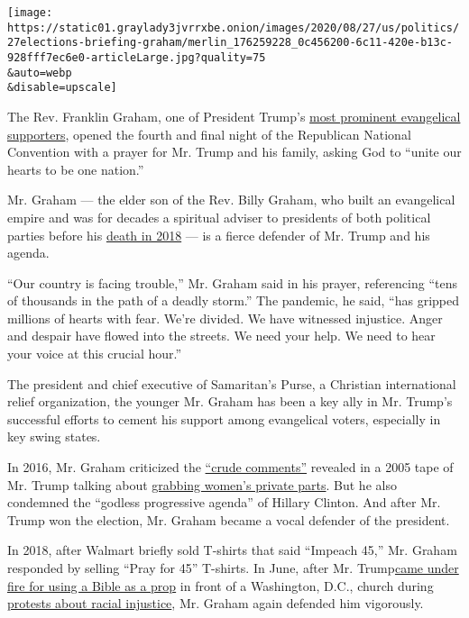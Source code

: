 \texttt{[image: https://static01.graylady3jvrrxbe.onion/images/2020/08/27/us/politics/27elections-briefing-graham/merlin\_176259228\_0c456200-6c11-420e-b13c-928fff7ec6e0-articleLarge.jpg?quality=75\\\&auto=webp\\\&disable=upscale]}

The Rev. Franklin Graham, one of President Trump's
\href{https://www.nytimes3xbfgragh.onion/2018/02/26/us/billy-graham-franklin-graham-trump.html}{most
prominent evangelical supporters}, opened the fourth and final night of
the Republican National Convention with a prayer for Mr. Trump and his
family, asking God to ``unite our hearts to be one nation.''

Mr. Graham --- the elder son of the Rev. Billy Graham, who built an
evangelical empire and was for decades a spiritual adviser to presidents
of both political parties before his
\href{https://www.nytimes3xbfgragh.onion/2018/02/21/obituaries/billy-graham-dead.html}{death
in 2018} --- is a fierce defender of Mr. Trump and his agenda.

``Our country is facing trouble,'' Mr. Graham said in his prayer,
referencing ``tens of thousands in the path of a deadly storm.'' The
pandemic, he said, ``has gripped millions of hearts with fear. We're
divided. We have witnessed injustice. Anger and despair have flowed into
the streets. We need your help. We need to hear your voice at this
crucial hour.''

The president and chief executive of Samaritan's Purse, a Christian
international relief organization, the younger Mr. Graham has been a key
ally in Mr. Trump's successful efforts to cement his support among
evangelical voters, especially in key swing states.

In 2016, Mr. Graham criticized the
\href{https://www.facebookcorewwwi.onion/FranklinGraham/posts/the-crude-comments-made-by-donald-j-trump-more-than-11-years-ago-cannot-be-defen/1271741769548668/}{``crude
comments''} revealed in a 2005 tape of Mr. Trump talking about
\href{https://www.nytimes3xbfgragh.onion/2016/10/08/us/donald-trump-tape-transcript.html}{grabbing
women's private parts}. But he also condemned the ``godless progressive
agenda'' of Hillary Clinton. And after Mr. Trump won the election, Mr.
Graham became a vocal defender of the president.

In 2018, after Walmart briefly sold T-shirts that said ``Impeach 45,''
Mr. Graham responded by selling ``Pray for 45'' T-shirts. In June, after
Mr.
Trump\href{https://www.nytimes3xbfgragh.onion/2020/06/02/us/politics/trump-walk-lafayette-square.html}{came
under fire for using a Bible as a prop} in front of a Washington, D.C.,
church during
\href{https://www.nytimes3xbfgragh.onion/news-event/george-floyd-protests-minneapolis-new-york-los-angeles}{protests
about racial injustice}, Mr. Graham again defended him vigorously.

